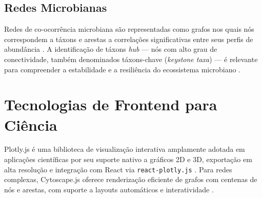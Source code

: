 \subsection{Redes Microbianas}

Redes de co-ocorrência microbiana são representadas como grafos nos
quais nós correspondem a táxons e arestas a correlações significativas
entre seus perfis de abundância \cite{faust2012microbial}. A
identificação de táxons \textit{hub} — nós com alto grau de
conectividade, também denominados táxons-chave (\textit{keystone taxa})
— é relevante para compreender a estabilidade e a resiliência do
ecossistema microbiano \cite{berry2014deciphering}.

\section{Tecnologias de Frontend para Ciência}

Plotly.js é uma biblioteca de visualização interativa amplamente
adotada em aplicações científicas por seu suporte nativo a gráficos
2D e 3D, exportação em alta resolução e integração com React via
\texttt{react-plotly.js} \cite{plotly2015}. Para redes complexas,
Cytoscape.js oferece renderização eficiente de grafos com centenas de
nós e arestas, com suporte a layouts automáticos e interatividade
\cite{franz2016cytoscape}.

